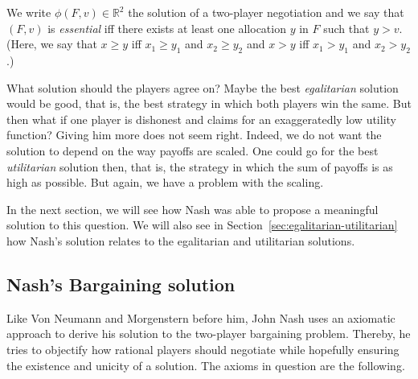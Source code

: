 We write $\phi(F, v) \in \mathbb{R}^2$ the solution of a two-player negotiation and we say that $(F, v)$ is \emph{essential} iff there exists at least one allocation $y$ in $F$ such that $y > v$. (Here, we say that $x \geq y$ iff $x_1 \geq y_1$ and $x_2 \geq y_2$ and $x > y$ iff $x_1 > y_1$ and $x_2 > y_2$.) 

What solution should the players agree on? Maybe the best \emph{egalitarian} solution would be good, that is, the best strategy in which both players win the same. But then what if one player is dishonest and claims for an exaggeratedly low utility function? Giving him more does not seem right. Indeed, we do not want the solution to depend on the way payoffs are scaled. One could go for the best \emph{utilitarian} solution then, that is, the strategy in which the sum of payoffs is as high as possible. But again, we have a problem with the scaling.

In the next section, we will see how Nash was able to propose a meaningful solution to this question. We will also see in Section~\ref{sec:egalitarian-utilitarian} how Nash's solution relates to the egalitarian and utilitarian solutions.



\subsection{Nash's Bargaining solution}



Like Von Neumann and Morgenstern before him, John Nash uses an axiomatic approach to derive his solution to the two-player bargaining problem. Thereby, he tries to objectify how rational players should negotiate while hopefully ensuring the existence and unicity of a solution. The axioms in question are the following.

